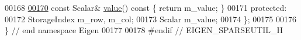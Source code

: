 \begin{DoxyCode}
00168 
\hyperlink{group___sparse_core___module_a003ea53c6559b106406f7916d6610547}{00170}   \textcolor{keyword}{const} Scalar& \hyperlink{group___sparse_core___module_a003ea53c6559b106406f7916d6610547}{value}()\textcolor{keyword}{ const }\{ \textcolor{keywordflow}{return} m\_value; \}
00171 \textcolor{keyword}{protected}:
00172   StorageIndex m\_row, m\_col;
00173   Scalar m\_value;
00174 \};
00175 
00176 \} \textcolor{comment}{// end namespace Eigen}
00177 
00178 \textcolor{preprocessor}{#endif // EIGEN\_SPARSEUTIL\_H}
\end{DoxyCode}
